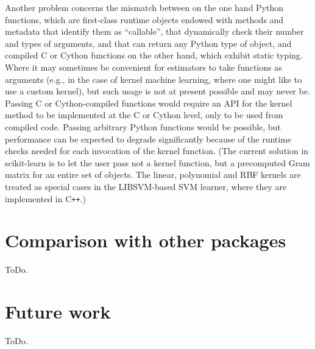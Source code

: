 \documentclass[a4paper]{article}
\DeclareRobustCommand{\VAN}[3]{#2}
\begin{document}
Another problem concerns the mismatch between on the one hand Python functions,
which are first-class runtime objects endowed with methods and metadata
that identify them as ``callable'',
that dynamically check their number and types of arguments,
and that can return any Python type of object,
and compiled C or Cython functions on the other hand,
which exhibit static typing.
Where it may sometimes be convenient for estimators
to take functions as arguments
(e.g., in the case of kernel machine learning,
where one might like to use a custom kernel),
but such usage is not at present possible and may never be.
Passing C or Cython-compiled functions would require an API for the kernel method
to be implemented at the C or Cython level,
only to be used from compiled code.
Passing arbitrary Python functions would be possible,
but performance can be expected to degrade significantly
because of the runtime checks needed for each invocation of the kernel function.
(The current solution in scikit-learn is to let the user pass not a kernel function,
but a precomputed Gram matrix for an entire set of objects.
The linear, polynomial and RBF kernels are treated as special cases in
the \textsf{LIBSVM}-based SVM learner, where they are implemented in C{}\verb!++!.)

\section{Comparison with other packages}

ToDo.

\section{Future work}

ToDo.


\DeclareRobustCommand{\VAN}[3]{#3}

\end{document}
